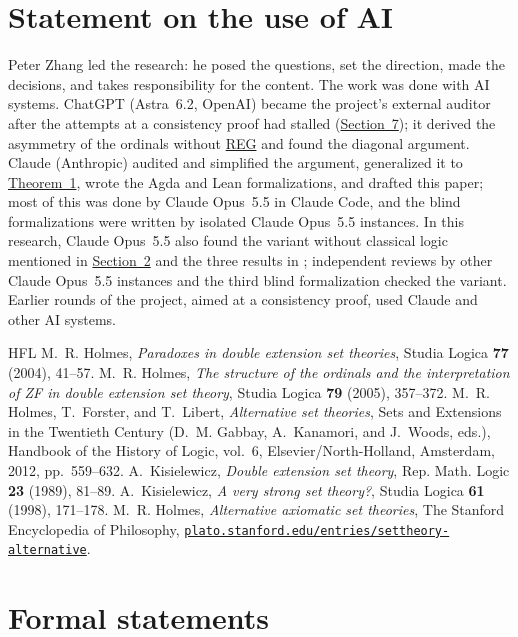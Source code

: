 \documentclass[11pt,a4paper]{article}
\makeatletter
\newcommand{\needspace}[1]{}
\newcommand{\icode}[1]{\lxWithClass{icode}{\texttt{#1}}}
\newcommand{\needspace}[1]{\par\penalty-100\begingroup\setlength{\dimen@}{#1}%
  \dimen@ii\pagegoal\advance\dimen@ii-\pagetotal
  \ifdim\dimen@>\dimen@ii\ifdim\dimen@ii>\z@\vfil\fi\break\fi\endgroup}
\newcommand{\icode}[1]{{\setlength{\fboxsep}{1.2pt}\colorbox{shadecolor}{\texttt{\vphantom{Ay}#1}}}}
\theoremstyle{definition}
\theoremstyle{remark}
\newcommand{\REG}{\textup{REG}}
\makeatother
\begin{document}
\section*{Statement on the use of AI}

Peter Zhang led the research: he posed the questions, set the direction, made the decisions, and takes responsibility for the content. The work was done with AI systems. ChatGPT (Astra~6.2, OpenAI) became the project's external auditor after the attempts at a consistency proof had stalled ({\hyperref[sec:7]{Section~7}}); it derived the asymmetry of the ordinals without {\hyperref[ax:REG]{\REG}}{} and found the diagonal argument. Claude \mbox{(Anthropic)} audited and simplified the argument, generalized it to {\hyperref[thm:1]{Theorem~1}}, wrote the Agda and Lean formalizations, and drafted this paper; most of this was done by Claude Opus~5.5 in Claude Code, and the blind formalizations were written by isolated Claude Opus~5.5 instances. In this research, Claude Opus~5.5 also found the variant without classical logic mentioned in {\hyperref[sec:2]{Section~2}} and the three results in \icode{agda/Supplement.agda}; independent reviews by other Claude Opus~5.5 instances and the third blind formalization checked the variant. Earlier rounds of the project, aimed at a consistency proof, used Claude and other AI systems.

\begingroup\small
\begin{thebibliography}{HFL}
 M.~R. Holmes, \emph{Paradoxes in double extension set theories}, Studia Logica \textbf{77} (2004), 41--57.
 M.~R. Holmes, \emph{The structure of the ordinals and the interpretation of ZF in double extension set theory}, Studia Logica \textbf{79} (2005), 357--372.
 M.~R. Holmes, T.~Forster, and T.~Libert, \emph{Alternative set theories}, Sets and Extensions in the Twentieth Century (D.~M. Gabbay, A.~Kanamori, and J.~Woods, eds.), Handbook of the History of Logic, vol.~6, Elsevier/North-Holland, Amsterdam, 2012, pp.~559--632.
 A.~Kisielewicz, \emph{Double extension set theory}, Rep. Math. Logic \textbf{23} (1989), 81--89.
 A.~Kisielewicz, \emph{A very strong set theory?}, Studia Logica \textbf{61} (1998), 171--178.
 M.~R. Holmes, \emph{Alternative axiomatic set theories}, The Stanford Encyclopedia of Philosophy, \href{https://plato.stanford.edu/entries/settheory-alternative/}{\texttt{plato.stanford.edu/entries/settheory-alternative}}.
\end{thebibliography}
\endgroup

\appendix
\iflatexml\else\makeatletter\renewcommand{\@seccntformat}[1]{\appendixname\ \csname the#1\endcsname\quad}\makeatother\fi
\needspace{10\baselineskip}
\section{Formal statements}\label{app:formal}


\end{document}
